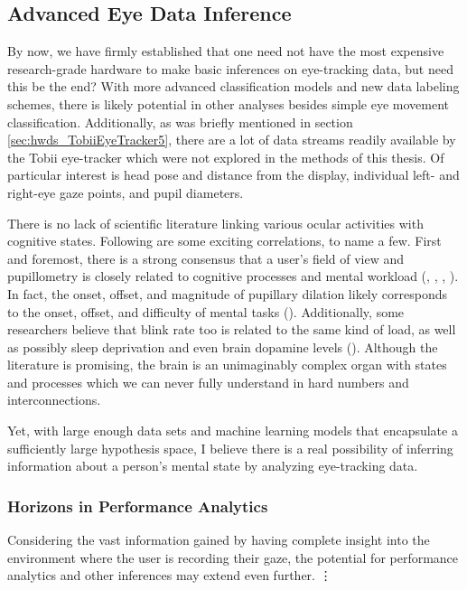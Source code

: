 \subsection{Advanced Eye Data Inference}

By now, we have firmly established that one need not have the most expensive research-grade hardware to make basic inferences on eye-tracking data, but need this be the end? With more advanced classification models and new data labeling schemes, there is likely potential in other analyses besides simple eye movement classification. Additionally, as was briefly mentioned in section \ref{sec:hwds_TobiiEyeTracker5}, there are a lot of data streams readily available by the Tobii eye-tracker which were not explored in the methods of this thesis. Of particular interest is head pose and distance from the display, individual left- and right-eye gaze points, and pupil diameters.

There is no lack of scientific literature linking various ocular activities with cognitive states. Following are some exciting correlations, to name a few. First and foremost, there is a strong consensus that a user's field of view and pupillometry is closely related to cognitive processes and mental workload (\cite{kahneman1966}, \cite{may1990}, \cite{chen2014}, \cite{seeber2013}). In fact, the onset, offset, and magnitude of pupillary dilation likely corresponds to the onset, offset, and difficulty of mental tasks (\cite{beatty1982}). Additionally, some researchers believe that blink rate too is related to the same kind of load, as well as possibly sleep deprivation and even brain dopamine levels (\cite{barbato1995}). Although the literature is promising, the brain is an unimaginably complex organ with states and processes which we can never fully understand in hard numbers and interconnections.

Yet, with large enough data sets and machine learning models that encapsulate a sufficiently large hypothesis space, I believe there is a real possibility of inferring information about a person's mental state by analyzing eye-tracking data. 

\subsubsection{Horizons in Performance Analytics}

Considering the vast information gained by having complete insight into the environment where the user is recording their gaze, the potential for performance analytics and other inferences may extend even further.
\vdots

